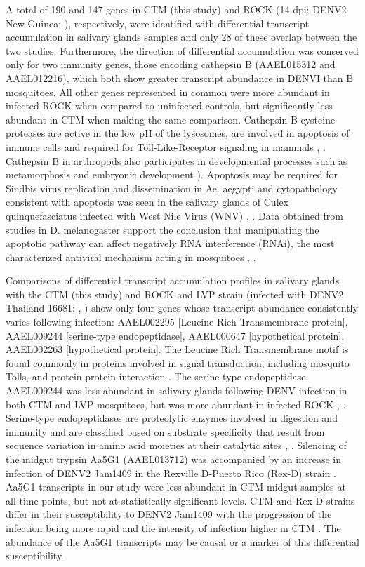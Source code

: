 A total of 190 and 147 genes in CTM (this study) and ROCK (14 dpi; DENV2 New Guinea; \cite{Sim2012}), respectively, were identified with differential transcript accumulation in salivary glands samples and only 28 of these overlap between the two studies.
Furthermore, the direction of differential accumulation was conserved only for two immunity genes, those encoding cathepsin B (AAEL015312 and AAEL012216), which both show greater transcript abundance in DENVI than B mosquitoes.
All other genes represented in common were more abundant in infected ROCK when compared to uninfected controls, but significantly less abundant in CTM when making the same comparison.
Cathepsin B cysteine proteases are active in the low pH of the lysosomes, are involved in apoptosis of immune cells and required for Toll-Like-Receptor signaling in mammals \cite{Conus2010}, \cite{Matsumoto2008}.
Cathepsin B in arthropods also participates in developmental processes such as metamorphosis and embryonic development \cite{Cho1999}).
Apoptosis may be required for Sindbis virus replication and dissemination in Ae. aegypti and cytopathology consistent with apoptosis was seen in the salivary glands of Culex quinquefasciatus infected with West Nile Virus (WNV) \cite{Wang2012}, \cite{Girard2007}.
Data obtained from studies in D.
melanogaster support the conclusion that manipulating the apoptotic pathway can affect negatively RNA interference (RNAi), the most characterized antiviral mechanism acting in mosquitoes \cite{Sanchez-Vargas2009}, \cite{Xie2011}.

Comparisons of differential transcript accumulation profiles in salivary glands with the CTM (this study) and ROCK and LVP strain (infected with DENV2 Thailand 16681; \cite{Luplertlop2011}, \cite{Sim2012}) show only four genes whose transcript abundance consistently varies following infection: AAEL002295 [Leucine Rich Transmembrane protein], AAEL009244 [serine-type endopeptidase], AAEL000647 [hypothetical protein], AAEL002263 [hypothetical protein].
The Leucine Rich Transmembrane motif is found commonly in proteins involved in signal transduction, including mosquito Tolls, and protein-protein interaction \cite{Kobe1994}.
The serine-type endopeptidase AAEL009244 was less abundant in salivary glands following DENV infection in both CTM and LVP mosquitoes, but was more abundant in infected ROCK \cite{Luplertlop2011}, \cite{Sim2012}.
Serine-type endopeptidases are proteolytic enzymes involved in digestion and immunity and are classified based on substrate specificity that result from sequence variation in amino acid moieties at their catalytic sites \cite{Gorman2001}, \cite{Brackney2010}.
Silencing of the midgut trypsin Aa5G1 (AAEL013712) was accompanied by an increase in infection of DENV2 Jam1409 in the Rexville D-Puerto Rico (Rex-D) strain \cite{Brackney2008}.
Aa5G1 transcripts in our study were less abundant in CTM midgut samples at all time points, but not at statistically-significant levels.
CTM and Rex-D strains differ in their susceptibility to DENV2 Jam1409 with the progression of the infection being more rapid and the intensity of infection higher in CTM \cite{Salazar2007}.
The abundance of the Aa5G1 transcripts may be causal or a marker of this differential susceptibility.

